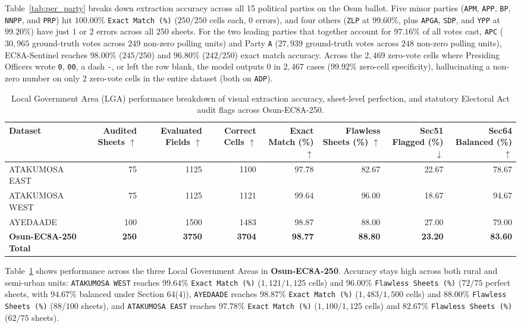 \documentclass{article}
\begin{document}
Table~\ref{tab:per_party} breaks down extraction accuracy across all 15 political parties on the Osun ballot. Five minor parties (\texttt{APM}, \texttt{APP}, \texttt{BP}, \texttt{NNPP}, and \texttt{PRP}) hit $100.00\%$ \texttt{Exact Match (\%)} ($250/250$ cells each, $0$ errors), and four others (\texttt{ZLP} at $99.60\%$, plus \texttt{APGA}, \texttt{SDP}, and \texttt{YPP} at $99.20\%$) have just $1$ or $2$ errors across all 250 sheets. For the two leading parties that together account for $97.16\%$ of all votes cast, \texttt{APC} ($30,965$ ground-truth votes across $249$ non-zero polling units) and Party \texttt{A} ($27,939$ ground-truth votes across $248$ non-zero polling units), EC8A-Sentinel reaches $98.00\%$ ($245/250$) and $96.80\%$ ($242/250$) exact match accuracy. Across the $2,469$ zero-vote cells where Presiding Officers wrote \texttt{0}, \texttt{00}, a dash \texttt{-}, or left the row blank, the model outputs $0$ in $2,467$ cases ($99.92\%$ zero-cell specificity), hallucinating a non-zero number on only $2$ zero-vote cells in the entire dataset (both on \texttt{ADP}).

\begin{table}[t]
\caption{Local Government Area (LGA) performance breakdown of visual extraction accuracy, sheet-level perfection, and statutory Electoral Act audit flags across Osun-EC8A-250.}
\label{tab:lga_breakdown}
\centering
\small
\begin{tabular}{lrrrrrrr}
\toprule
Dataset & Audited Sheets $\uparrow$ & Evaluated Fields $\uparrow$ & Correct Cells $\uparrow$ & Exact Match (\%) $\uparrow$ & Flawless Sheets (\%) $\uparrow$ & Sec51 Flagged (\%) $\downarrow$ & Sec64 Balanced (\%) $\uparrow$ \\
\midrule
ATAKUMOSA EAST & 75 & 1125 & 1100 & 97.78 & 82.67 & 22.67 & 78.67 \\
ATAKUMOSA WEST & 75 & 1125 & 1121 & 99.64 & 96.00 & 18.67 & 94.67 \\
AYEDAADE & 100 & 1500 & 1483 & 98.87 & 88.00 & 27.00 & 79.00 \\
\midrule
\textbf{Osun-EC8A-250 Total} & \textbf{250} & \textbf{3750} & \textbf{3704} & \textbf{98.77} & \textbf{88.80} & \textbf{23.20} & \textbf{83.60} \\
\bottomrule
\end{tabular}
\end{table}

Table~\ref{tab:lga_breakdown} shows performance across the three Local Government Areas in \textbf{Osun-EC8A-250}. Accuracy stays high across both rural and semi-urban units: \texttt{ATAKUMOSA WEST} reaches $99.64\%$ \texttt{Exact Match (\%)} ($1,121 / 1,125$ cells) and $96.00\%$ \texttt{Flawless Sheets (\%)} ($72 / 75$ perfect sheets, with $94.67\%$ balanced under Section 64(4)), \texttt{AYEDAADE} reaches $98.87\%$ \texttt{Exact Match (\%)} ($1,483 / 1,500$ cells) and $88.00\%$ \texttt{Flawless Sheets (\%)} ($88 / 100$ sheets), and \texttt{ATAKUMOSA EAST} reaches $97.78\%$ \texttt{Exact Match (\%)} ($1,100 / 1,125$ cells) and $82.67\%$ \texttt{Flawless Sheets (\%)} ($62 / 75$ sheets).
\end{document}
